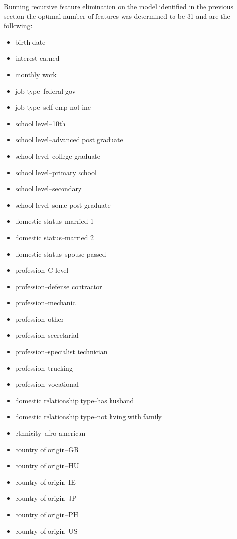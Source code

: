Running recursive feature elimination on the model identified in the previous
section the optimal number of features was determined to be 31 and are the
following:
\begin{itemize}
    \item birth date
    \item interest earned
    \item monthly work
    \item job type--federal-gov
    \item job type--self-emp-not-inc
    \item school level--10th
    \item school level--advanced post graduate
    \item school level--college graduate
    \item school level--primary school
    \item school level--secondary
    \item school level--some post graduate
    \item domestic status--married 1
    \item domestic status--married 2
    \item domestic status--spouse passed
    \item profession--C-level
    \item profession--defense contractor
    \item profession--mechanic
    \item profession--other
    \item profession--secretarial
    \item profession--specialist technician
    \item profession--trucking
    \item profession--vocational
    \item domestic relationship type--has husband
    \item domestic relationship type--not living with family
    \item ethnicity--afro american
    \item country of origin--GR
    \item country of origin--HU
    \item country of origin--IE
    \item country of origin--JP
    \item country of origin--PH
    \item country of origin--US
\end{itemize}

